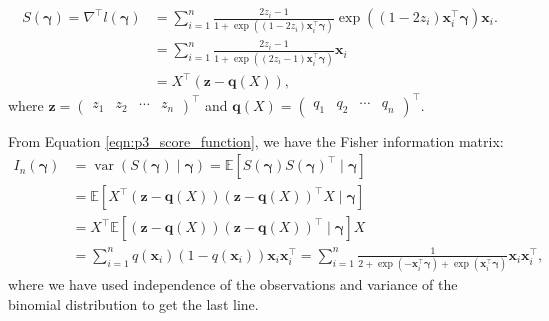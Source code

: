 \documentclass[letterpaper,11pt]{article}
\begin{document}
\begin{enumerate}
\begin{description}
    \begin{align}
      S\left(\bm\gamma\right)
      = \nabla^\intercal l\left(\bm\gamma\right)
      &= \sum_{i=1}^n \frac{2z_i - 1}{1 + \exp\left(
        \left(1 - 2z_i\right)\mathbf{x}_i^\intercal\bm{\gamma}
        \right)}\exp\left(
        \left(1 - 2z_i\right)\mathbf{x}_i^\intercal\bm{\gamma}
        \right)\mathbf{x}_i.
        \nonumber\\
      &= \sum_{i=1}^n \frac{2z_i - 1}{1 + \exp\left(
        \left(2z_i - 1\right)\mathbf{x}_i^\intercal\bm{\gamma}
        \right)}\mathbf{x}_i \nonumber\\
      &= X^\intercal\left(
        \mathbf{z} - \mathbf{q}\left(X\right)
        \right),
    \label{eqn:p3_score_function}
    \end{align}
    where
    $\mathbf{z} = \begin{pmatrix}z_1 & z_2 & \cdots & z_n\end{pmatrix}^\intercal$ and
    $\mathbf{q}\left(X\right) = \begin{pmatrix}q_1 & q_2 &
      \cdots & q_n\end{pmatrix}^\intercal$.
    
    From Equation \ref{eqn:p3_score_function}, we have the Fisher information
    matrix:
    \begin{align}
      I_n\left(\bm\gamma\right)
      &= \operatorname{var}\left(S\left(\bm\gamma\right) \mid \bm\gamma\right)
        = \mathbb{E}\left[
        S\left(\bm\gamma\right)
        S\left(\bm\gamma\right)^\intercal
        \mid \bm\gamma
        \right] \nonumber\\
      &= \mathbb{E}\left[
        X^\intercal\left(
        \mathbf{z} - \mathbf{q}\left(X\right)
        \right)
        \left(
        \mathbf{z} - \mathbf{q}\left(X\right)
        \right)^\intercal
        X \mid \bm\gamma
        \right] \nonumber \\
      &= X^\intercal\mathbb{E}\left[
        \left(
        \mathbf{z} - \mathbf{q}\left(X\right)
        \right)
        \left(
        \mathbf{z} - \mathbf{q}\left(X\right)
        \right)^\intercal
        \mid \bm\gamma
        \right]X \nonumber\\
      &= \sum_{i=1}^n 
        q\left(\mathbf{x}_i\right)
        \left(1 - q\left(\mathbf{x}_i\right)\right)
        \mathbf{x}_i\mathbf{x}_i^\intercal
        =
        \sum_{i=1}^n
        \frac{1}{2 + \exp\left(
        -\mathbf{x}_i^\intercal \bm\gamma
        \right) + \exp\left(
        \mathbf{x}_i^\intercal \bm\gamma
        \right)}
        \mathbf{x}_i\mathbf{x}_i^\intercal
        ,
        \label{eqn:p3_fisher_information}
    \end{align}
    where we have used independence of the observations and variance of the
    binomial distribution to get the last line.


\end{description}
\end{enumerate}
\end{document}
